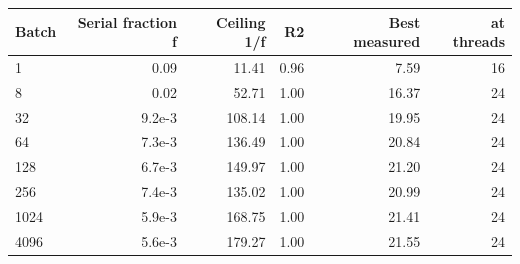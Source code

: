 \begin{tabular}{lrrrrr}
\toprule
Batch & Serial fraction f & Ceiling 1/f & R2 & Best measured & at threads \\
\midrule
1 & 0.09 & 11.41 & 0.96 & 7.59 & 16 \\
8 & 0.02 & 52.71 & 1.00 & 16.37 & 24 \\
32 & 9.2e-3 & 108.14 & 1.00 & 19.95 & 24 \\
64 & 7.3e-3 & 136.49 & 1.00 & 20.84 & 24 \\
128 & 6.7e-3 & 149.97 & 1.00 & 21.20 & 24 \\
256 & 7.4e-3 & 135.02 & 1.00 & 20.99 & 24 \\
1024 & 5.9e-3 & 168.75 & 1.00 & 21.41 & 24 \\
4096 & 5.6e-3 & 179.27 & 1.00 & 21.55 & 24 \\
\bottomrule
\end{tabular}
